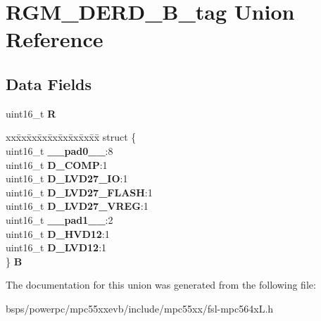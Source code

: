 \hypertarget{unionRGM__DERD__16B__tag}{}\section{R\+G\+M\+\_\+\+D\+E\+R\+D\+\_\+B\+\_\+tag Union Reference}
\label{unionRGM__DERD__16B__tag}
\subsection*{Data Fields}
\begin{DoxyCompactItemize}
\item 
\mbox{\label{unionRGM__DERD__16B__tag_aad6e5bb680dbe29f170168afbffb4e16}} 
uint16\+\_\+t {\bfseries R}
\item 
\mbox{\label{unionRGM__DERD__16B__tag_ace59d125e56cd51942a5bc76c9c7c489}} 
\begin{tabbing}
xx\=xx\=xx\=xx\=xx\=xx\=xx\=xx\=xx\=\kill
struct \{\\
\>uint16\_t {\bfseries \_\_pad0\_\_}:8\\
\>uint16\_t {\bfseries D\_COMP}:1\\
\>uint16\_t {\bfseries D\_LVD27\_IO}:1\\
\>uint16\_t {\bfseries D\_LVD27\_FLASH}:1\\
\>uint16\_t {\bfseries D\_LVD27\_VREG}:1\\
\>uint16\_t {\bfseries \_\_pad1\_\_}:2\\
\>uint16\_t {\bfseries D\_HVD12}:1\\
\>uint16\_t {\bfseries D\_LVD12}:1\\
\} {\bfseries B}\\

\end{tabbing}\end{DoxyCompactItemize}


The documentation for this union was generated from the following file\+:\begin{DoxyCompactItemize}
\item 
bsps/powerpc/mpc55xxevb/include/mpc55xx/fsl-\/mpc564x\+L.\+h\end{DoxyCompactItemize}

